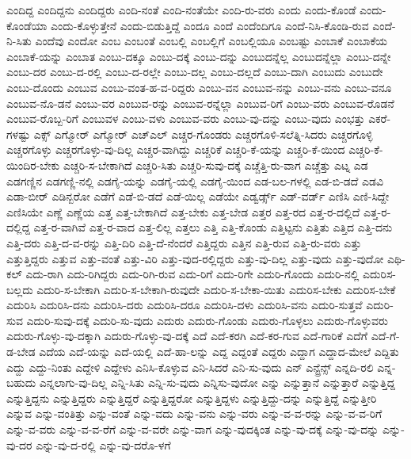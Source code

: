 {ಎಂದಿದ್ದ
ಎಂದಿದ್ದನು
ಎಂದಿದ್ದರು
ಎಂದಿ-ನಂತೆ
ಎಂದಿ-ನಂತೆಯೇ
ಎಂದಿ-ರು-ವರು
ಎಂದು
ಎಂದು-ಕೊಂಡೆ
ಎಂದು-ಕೊಂಡೆಯಾ
ಎಂದು-ಕೊಳ್ಳುತ್ತೇನೆ
ಎಂದು-ಬಿಡುತ್ತಿದ್ದೆ
ಎಂದೂ
ಎಂದೆ
ಎಂದೆಂದಿಗೂ
ಎಂದೆ-ನಿಸಿ-ಕೊಂಡಿ-ರುವ
ಎಂದೆ-ನಿ-ಸಿತು
ಎಂದೆವು
ಎಂದೋ
ಎಂಬ
ಎಂಬಂತೆ
ಎಂಬಲ್ಲಿ
ಎಂಬಲ್ಲಿಗೆ
ಎಂಬಲ್ಲಿಯೂ
ಎಂಬಷ್ಟು
ಎಂಬಾಕೆ
ಎಂಬಾಕೆಯ
ಎಂಬಾಕೆ-ಯನ್ನು
ಎಂಬಾತ
ಎಂಬು-ದಕ್ಕೂ
ಎಂಬು-ದಕ್ಕೆ
ಎಂಬು-ದನ್ನು
ಎಂಬುದನ್ನೆಲ್ಲ
ಎಂಬುದನ್ನೆಲ್ಲಾ
ಎಂಬು-ದನ್ನೇ
ಎಂಬು-ದರ
ಎಂಬು-ದ-ರಲ್ಲಿ
ಎಂಬು-ದ-ರಲ್ಲೇ
ಎಂಬು-ದಲ್ಲ
ಎಂಬು-ದಲ್ಲದೆ
ಎಂಬು-ದಾಗಿ
ಎಂಬುದು
ಎಂಬುದೇ
ಎಂಬು-ದೊಂದು
ಎಂಬುವ
ಎಂಬು-ವಂತ-ಹ-ವ-ರಿದ್ದರು
ಎಂಬು-ವನ
ಎಂಬುವ-ನನ್ನು
ಎಂಬು-ವನು
ಎಂಬು-ವನೂ
ಎಂಬುವ-ನೊ-ಡನೆ
ಎಂಬು-ವರ
ಎಂಬುವ-ರನ್ನು
ಎಂಬುವ-ರನ್ನೆಲ್ಲಾ
ಎಂಬುವ-ರಿಗೆ
ಎಂಬು-ವರು
ಎಂಬುವ-ರೊಡನೆ
ಎಂಬುವ-ರೊಬ್ಬ-ರಿಗೆ
ಎಂಬುವಳ
ಎಂಬು-ವಳು
ಎಂಬುವ-ವರು
ಎಂಬು-ವು-ದನ್ನು
ಎಂಬು-ವುದು
ಎಂಭತ್ತು
ಎಕರೆ-ಗಳಷ್ಟು
ಎಕ್ಸ್
ಎಗ್ಮೋರ್
ಎಗ್ಮೋರ್
ಎಚ್ಎಲ್
ಎಚ್ಚರ-ಗೊಂಡರು
ಎಚ್ಚರಗೊಳಿ-ಸಲೆತ್ನಿ-ಸಿದರು
ಎಚ್ಚರಗೊಳ್ಳಿ
ಎಚ್ಚರಗೊಳ್ಳು
ಎಚ್ಚರಗೊಳ್ಳು-ವು-ದಿಲ್ಲ
ಎಚ್ಚರ-ವಾಗಿದ್ದು
ಎಚ್ಚರಿಕೆ
ಎಚ್ಚರಿ-ಕೆ-ಯನ್ನು
ಎಚ್ಚರಿ-ಕೆ-ಯಿಂದ
ಎಚ್ಚರಿ-ಕೆ-ಯಿಂದಿರ-ಬೇಕು
ಎಚ್ಚರಿ-ಸ-ಬೇಕಾಗಿದೆ
ಎಚ್ಚರಿ-ಸಿತು
ಎಚ್ಚರಿ-ಸುವು-ದಕ್ಕೆ
ಎಚ್ಚೆತ್ತಿ-ರು-ವಾಗ
ಎಚ್ಚೆತ್ತು
ಎಟ್ನ
ಎಡ
ಎಡಗಣ್ಣಿನ
ಎಡಗಣ್ಣಿ-ನಲ್ಲಿ
ಎಡಗೈ-ಯನ್ನು
ಎಡಗೈ-ಯಲ್ಲಿ
ಎಡಗೈ-ಯಿಂದ
ಎಡ-ಬಲ-ಗಳಲ್ಲಿ
ಎಡ-ಬಿ-ಡದೆ
ಎಡವಿ
ಎಡಾ-ಬೀರ್
ಎಡಿನ್ಬರೋ
ಎಡೆಗೆ
ಎಡೆ-ಬಿ-ಡದೆ
ಎಡೆ-ಯಿಲ್ಲ
ಎಡೆಯೇ
ಎಡ್ವರ್ಡ್ಸ್
ಎಡ್-ವರ್ಡ್
ಎಣಿಸಿ
ಎಣಿ-ಸಿದ್ದೇ
ಎಣಿಸಿಯೇ
ಎಣ್ಣೆ
ಎಣ್ಣೆಯ
ಎತ್ತ
ಎತ್ತ-ಬೇಕಾಗಿದೆ
ಎತ್ತ-ಬೇಕು
ಎತ್ತ-ಬೇಡ
ಎತ್ತರ
ಎತ್ತ-ರದ
ಎತ್ತ-ರ-ದಲ್ಲಿದೆ
ಎತ್ತ-ರ-ದಲ್ಲಿದ್ದ
ಎತ್ತ-ರ-ವಾಗಿವೆ
ಎತ್ತ-ರ-ವಾದ
ಎತ್ತ-ಲಿಲ್ಲ
ಎತ್ತಲು
ಎತ್ತಿ
ಎತ್ತಿ-ಕೊಂಡು
ಎತ್ತಿಟ್ಟನು
ಎತ್ತಿತು
ಎತ್ತಿದ
ಎತ್ತಿ-ದನು
ಎತ್ತಿ-ದರು
ಎತ್ತಿ-ದ-ವ-ರನ್ನು
ಎತ್ತಿ-ದಿರಿ
ಎತ್ತಿ-ದೆ-ನೆಂದರೆ
ಎತ್ತಿದ್ದರು
ಎತ್ತಿನ
ಎತ್ತಿ-ರುವ
ಎತ್ತಿ-ರು-ವರು
ಎತ್ತು
ಎತ್ತುತ್ತಿದ್ದರು
ಎತ್ತುವ
ಎತ್ತು-ವಂತೆ
ಎತ್ತು-ವಿರಿ
ಎತ್ತು-ವುದ-ರಲ್ಲಿದ್ದರು
ಎತ್ತು-ವು-ದಿಲ್ಲ
ಎತ್ತು-ವುದು
ಎತ್ತು-ವುದೋ
ಎಥಿ-ಕಲ್
ಎದು-ರಾಗಿ
ಎದು-ರಿಗಿದ್ದರು
ಎದು-ರಿಗಿ-ರುವ
ಎದು-ರಿಗೆ
ಎದು-ರಿಗೇ
ಎದುರಿ-ಗೊಂದು
ಎದುರಿ-ನಲ್ಲಿ
ಎದುರಿಸ-ಬಲ್ಲದು
ಎದುರಿ-ಸ-ಬೇಕಾಗಿ
ಎದುರಿ-ಸ-ಬೇಕಾಗಿ-ರುವುದೇ
ಎದುರಿ-ಸ-ಬೇಕಾ-ಯಿತು
ಎದುರಿಸ-ಬೇಕು
ಎದುರಿಸ-ಬೇಕೆ
ಎದುರಿಸಿ
ಎದುರಿಸಿ-ದನು
ಎದುರಿಸಿ-ದರು
ಎದುರಿಸಿ-ದರೂ
ಎದುರಿಸಿ-ದಳು
ಎದುರಿಸಿ-ವನು
ಎದುರಿ-ಸುತ್ತವೆ
ಎದುರಿ-ಸುವ
ಎದುರಿ-ಸುವು-ದಕ್ಕೆ
ಎದುರಿ-ಸು-ವುದು
ಎದುರು
ಎದುರು-ಗೊಂಡು
ಎದುರು-ಗೊಳ್ಳಲು
ಎದುರು-ಗೊಳ್ಳುವರು
ಎದುರು-ಗೊಳ್ಳು-ವು-ದಕ್ಕಾಗಿ
ಎದುರು-ಗೊಳ್ಳು-ವು-ದಕ್ಕೆ
ಎದೆ
ಎದೆ-ಕರಗಿ
ಎದೆ-ಕರ-ಗುವ
ಎದೆ-ಗಾರಿಕೆ
ಎದೆಗೆ
ಎದೆ-ಗೆ-ಡ-ಬೇಡ
ಎದೆಯ
ಎದೆ-ಯನ್ನು
ಎದೆ-ಯಲ್ಲಿ
ಎದೆ-ಹಾ-ಲನ್ನು
ಎದ್ದ
ಎದ್ದಂತೆ
ಎದ್ದರು
ಎದ್ದಾಗ
ಎದ್ದಾದ-ಮೇಲೆ
ಎದ್ದಿತು
ಎದ್ದು
ಎದ್ದು-ನಿಂತು
ಎದ್ದೇಳಿ
ಎದ್ದೇಳು
ಎನಿಸಿ-ಕೊಳ್ಳುವ
ಎನಿ-ಸಿದರೆ
ಎನಿ-ಸು-ವುದು
ಎನ್
ಎನ್ಟ್ರೆನ್ಸ್
ಎನ್ನದಿ-ರಲಿ
ಎನ್ನ-ಬಹುದು
ಎನ್ನಲಾಗು-ವು-ದಿಲ್ಲ
ಎನ್ನಿ-ಸಿತು
ಎನ್ನಿ-ಸು-ವುದು
ಎನ್ನಿಸು-ವುದೋ
ಎನ್ನು
ಎನ್ನುತ್ತಾನೆ
ಎನ್ನುತ್ತಾರೆ
ಎನ್ನುತ್ತಿದ್ದ
ಎನ್ನುತ್ತಿದ್ದನು
ಎನ್ನುತ್ತಿದ್ದರು
ಎನ್ನುತ್ತಿದ್ದರೆ
ಎನ್ನುತ್ತಿದ್ದರೋ
ಎನ್ನುತ್ತಿದ್ದಳು
ಎನ್ನುತ್ತಿದ್ದು-ದನ್ನು
ಎನ್ನುತ್ತಿದ್ದೆ
ಎನ್ನುತ್ತೀರಿ
ಎನ್ನುವ
ಎನ್ನು-ವಂತಿತ್ತು
ಎನ್ನು-ವಂತೆ
ಎನ್ನು-ವದು
ಎನ್ನು-ವನು
ಎನ್ನು-ವರು
ಎನ್ನು-ವ-ವ-ರನ್ನು
ಎನ್ನು-ವ-ವ-ರಿಗೆ
ಎನ್ನು-ವ-ವರು
ಎನ್ನು-ವ-ವ-ರೆಗೆ
ಎನ್ನು-ವ-ವರೇ
ಎನ್ನು-ವಾಗ
ಎನ್ನು-ವುದಕ್ಕಿಂತ
ಎನ್ನು-ವು-ದಕ್ಕೆ
ಎನ್ನು-ವು-ದನ್ನು
ಎನ್ನು-ವು-ದರ
ಎನ್ನು-ವು-ದ-ರಲ್ಲಿ
ಎನ್ನು-ವು-ದರೊ-ಳಗೆ
}
